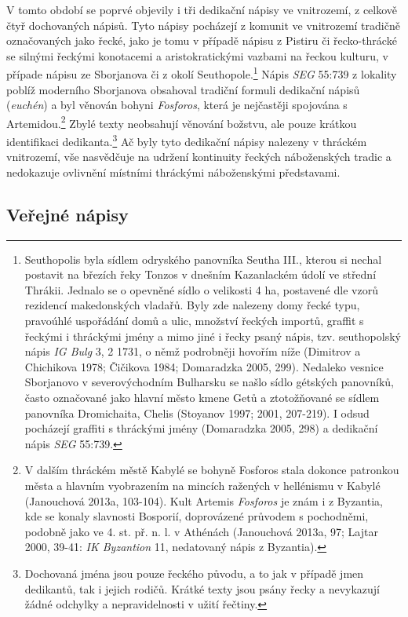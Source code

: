 V tomto období se poprvé objevily i tři dedikační nápisy ve vnitrozemí, z celkově čtyř dochovaných nápisů. Tyto nápisy pocházejí z komunit ve vnitrozemí tradičně označovaných jako řecké, jako je tomu v případě nápisu z Pistiru či řecko-thrácké se silnými řeckými konotacemi a aristokratickými vazbami na řeckou kulturu, v případe nápisu ze Sborjanova či z okolí Seuthopole.\footnote{Seuthopolis byla sídlem odryského panovníka Seutha III., kterou si nechal postavit na březích řeky Tonzos v dnešním Kazanlackém údolí ve střední Thrákii. Jednalo se o opevněné sídlo o velikosti 4 ha, postavené dle vzorů rezidencí makedonských vladařů. Byly zde nalezeny domy řecké typu, pravoúhlé uspořádání domů a ulic, množství řeckých importů, graffit s řeckými i thráckými jmény a mimo jiné i řecky psaný nápis, tzv. seuthopolský nápis {\em IG Bulg} 3, 2 1731, o němž podrobněji hovořím níže (Dimitrov a Chichikova 1978; Čičikova 1984; Domaradzka 2005, 299). Nedaleko vesnice Sborjanovo v severovýchodním Bulharsku se našlo sídlo gétských panovníků, často označované jako hlavní město kmene Getů a ztotožňované se sídlem panovníka Dromichaita, Chelis (Stoyanov 1997; 2001, 207-219). I odsud pocházejí graffiti s thráckými jmény (Domaradzka 2005, 298) a dedikační nápis {\em SEG} 55:739.} Nápis {\em SEG} 55:739 z lokality poblíž moderního Sborjanova obsahoval tradiční formuli dedikační nápisů ({\em euchén}) a byl věnován bohyni {\em Fosforos}, která je nejčastěji spojována s Artemidou.\footnote{V dalším thráckém městě Kabylé se bohyně Fosforos stala dokonce patronkou města a hlavním vyobrazením na mincích ražených v hellénismu v Kabylé (Janouchová 2013a, 103-104). Kult Artemis {\em Fosforos} je znám i z Byzantia, kde se konaly slavnosti Bosporií, doprovázené průvodem s pochodněmi, podobně jako ve 4. st. př. n. l. v Athénách (Janouchová 2013a, 97; Lajtar 2000, 39-41: {\em IK Byzantion} 11, nedatovaný nápis z Byzantia).} Zbylé texty neobsahují věnování božstvu, ale pouze krátkou identifikaci dedikanta.\footnote{Dochovaná jména jsou pouze řeckého původu, a to jak v případě jmen dedikantů, tak i jejich rodičů. Krátké texty jsou psány řecky a nevykazují žádné odchylky a nepravidelnosti v užití řečtiny.} Ač byly tyto dedikační nápisy nalezeny v thráckém vnitrozemí, vše nasvědčuje na udržení kontinuity řeckých náboženských tradic a nedokazuje ovlivnění místními thráckými náboženskými představami.

\subsection[veřejné-nápisy-4]{Veřejné nápisy}

